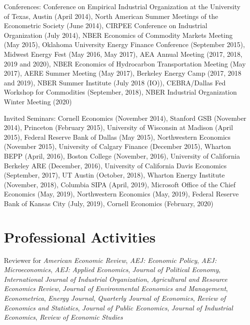 \documentclass[10pt,letterpaper]{article}
\renewenvironment{itemize}{
  \begin{list}{}{
    \setlength{\leftmargin}{1.5em}
    \setlength{\itemsep}{0.25em}
    \setlength{\parskip}{0pt}
    \setlength{\parsep}{0.25em}
  }
}{
  \end{list}
}
\begin{document}
\begin{itemize}
\item Conferences: Conference on Empirical Industrial Organization at the University of Texas, Austin (April 2014), North American Summer Meetings of the Econometric Society (June 2014), CIRPEE Conference on Industrial Organization (July 2014), NBER Economics of Commodity Markets Meeting (May 2015), Oklahoma University Energy Finance Conference (September 2015), Midwest Energy Fest (May 2016, May 2017), AEA Annual Meeting (2017, 2018, 2019 and 2020), NBER Economics of Hydrocarbon Transportation Meeting (May 2017), AERE Summer Meeting (May 2017), Berkeley Energy Camp (2017, 2018 and 2019), NBER Summer Institute (July 2018 (IO)), CEBRA/Dallas Fed Workshop for Commodities (September, 2018), NBER Industrial Organization Winter Meeting (2020)
\item Invited Seminars: Cornell Economics (November 2014), Stanford GSB (November 2014), Princeton (February 2015), University of Wisconsin at Madison (April 2015), Federal Reserve Bank of Dallas (May 2015), Northwestern Economics (November 2015), University of Calgary Finance (December 2015), Wharton BEPP (April, 2016), Boston College (November, 2016), University of California Berkeley ARE (December, 2016), University of California Davis Economics (September, 2017), UT Austin (October, 2018), Wharton Energy Institute (November, 2018), Columbia SIPA (April, 2019), Microsoft Office of the Chief Economics (May, 2019), Northwestern Economics (May, 2019), Federal Reserve Bank of Kansas City (July, 2019), Cornell Economics (February, 2020)
\end{itemize}


\section*{Professional Activities}


\begin{itemize}
\item Reviewer for
  \textit{American Economic Review}, \textit{AEJ: Economic Policy}, \textit{AEJ: Microeconomics}, \textit{AEJ: Applied Economics}, \textit{Journal of Political Economy}, \textit{International Journal of Industrial Organization}, \textit{Agricultural and Resource Economics Review}, \textit{Journal of Environmental Economics and Management}, \textit{Econometrica}, \textit{Energy Journal}, \textit{Quarterly Journal of Economics}, \textit{Review of Economics and Statistics}, \textit{Journal of Public Economics}, \textit{Journal of Industrial Economics}, \textit{Review of Economic Studies}
\end{itemize}
\end{document}
